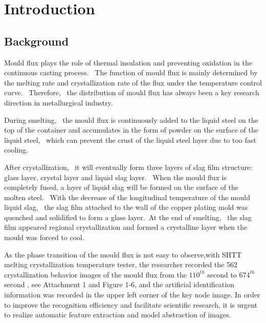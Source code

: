 \documentclass{apmcmthesis}
\begin{document}
\newpage
\tableofcontents

\newpage
\pagestyle{mainmatterstyle}
\setcounter{page}{1}
\section{Introduction}

\subsection{Background}
		Mould flux plays the role of thermal insulation and preventing oxidation in the continuous casting process. \  The function of mould flux is mainly determined by the melting rate and crystallization rate of the flux under the temperature control curve.  \  Therefore, \  the distribution of mould flux has always been a key research direction in metallurgical industry.

		During smelting, \ the mould flux is continuously added to the liquid steel on the top of the container and accumulates in the form of powder on the surface of the liquid steel, \ which can prevent the crust of the liquid steel layer due to too fast cooling.
		
		After crystallization, \ it will eventually form three layers of slag film structure: glass layer, crystal layer and liquid slag layer. \ When the mould flux is completely fused, a layer of liquid slag will be formed on the surface of the molten steel. \ With the decrease of the longitudinal temperature of the mould liquid slag, \ the slag film attached to the wall of the copper plating mold was quenched and solidified to form a glass layer.\  At the end of smelting, \ the slag film appeared regional crystallization and formed a crystalline layer when the mould was forced to cool.
		
		As the phase transition of the mould flux is not easy to observe,with SHTT melting crystallization temperature tester, the researcher recorded the 562 crystallization behavior images of the mould flux from the $110^{th}$ second to $674^{th}$ second , see Attachment 1 and Figure 1-6, and the artificial identification information was recorded in the upper left corner of the key node image. In order to improve the recognition efficiency and facilitate scientific research, it is urgent to realize automatic feature extraction and model abstraction of images.
		
\end{document}
